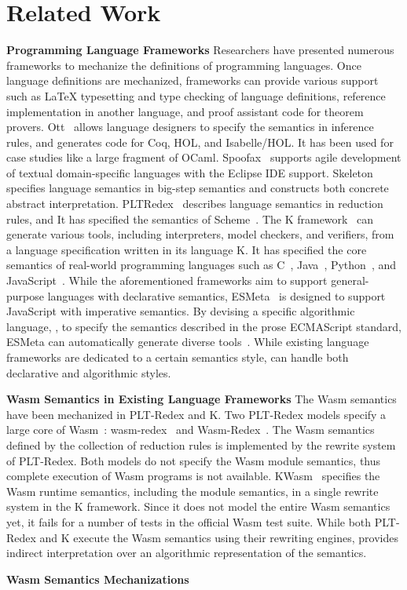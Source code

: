 
\newpage
\section{Related Work}
\label{sec:related}

\textbf{Programming Language Frameworks}
Researchers have presented numerous frameworks to mechanize the
definitions of programming languages.
Once language definitions are mechanized, frameworks can provide various support
such as LaTeX typesetting and type checking of language definitions,
reference implementation in another language, and 
proof assistant code for theorem provers.
Ott~\cite{ott} allows language designers to specify the semantics in inference rules,
and generates code for Coq, HOL, and Isabelle/HOL.
It has been used for case studies like a large fragment of OCaml.
Spoofax~\cite{spoofax} supports agile development of textual
domain-specific languages with the Eclipse IDE support.
Skeleton~\cite{skeleton} specifies language semantics in big-step semantics
and constructs both concrete abstract interpretation.
PLTRedex~\cite{pltredex} describes language semantics in reduction rules,
and It has specified the semantics of Scheme~\cite{r6rs}.
The K framework~\cite{k} can generate various tools,
including interpreters, model checkers, and verifiers, from a language specification
written in its language K. It has specified the core semantics of real-world programming languages
such as C~\cite{kc}, Java~\cite{kjava}, Python~\cite{kpython}, and JavaScript~\cite{kjs}.
While the aforementioned frameworks aim to support general-purpose languages
with declarative semantics, ESMeta~\cite{esmeta} is designed to
support JavaScript with imperative semantics.
By devising a specific algorithmic language, \ires,
to specify the semantics described in the prose ECMAScript standard,
ESMeta can automatically generate diverse tools~\cite{jiset,jest,jstar,jsaver}.
While existing language frameworks are dedicated to a certain semantics style,
\dslname can handle both declarative and algorithmic styles.

\textbf{Wasm Semantics in Existing Language Frameworks}
The Wasm semantics have been mechanized in PLT-Redex and K.
Two PLT-Redex models specify a large core of Wasm~\cite{wasm-pldi17}:
wasm-redex~\cite{wasm-redex-asumu} and Wasm-Redex~\cite{wasm-redex-adam}.
The Wasm semantics defined by the collection of reduction rules is implemented
by the rewrite system of PLT-Redex.
Both models do not specify the Wasm module semantics, thus complete execution of
Wasm programs is not available.
KWasm~\cite{wasm-k} specifies the Wasm runtime semantics, including the module semantics,
in a single rewrite system in the K framework.
Since it does not model the entire Wasm semantics yet,
it fails for a number of tests in the official Wasm test suite.
While both PLT-Redex and K execute the Wasm semantics using their rewriting engines,
\dslname provides indirect interpretation over an algorithmic representation of the semantics.

\textbf{Wasm Semantics Mechanizations}
